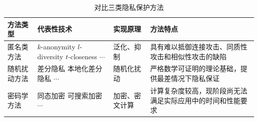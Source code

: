 \begin{table}[htbp]

\caption{对比三类隐私保护方法}
\label{tab:comparisionPrivacyMechanisms_1.2}
\centering
\fontsize{10pt}{\baselineskip}\selectfont

\begin{tabular}{p{}p{}p{}p{}}
\toprule
	\textbf{方法类型}&\textbf{代表性技术}&\textbf{实现原理}&\textbf{方法特点}\\
	\midrule
  匿名类方法 & \makecell[l]{$k$-anonymity \\ $l$-diversity \\$t$-closeness\\ $\cdots$} &泛化、抑制&具有难以抵御连接攻击、同质性攻击和相似性攻击的缺陷 \\
随机扰动方法 & \makecell[l]{差分隐私\\ 本地化差分隐私\\ $\cdots$} &随机化扰动& 严格数学可证明的理论基础，提供最差情况下隐私保证\\
密码学方法 & \makecell[l]{同态加密\\ 可搜索加密 \\ $\cdots$} &加密、密文计算&计算复杂度较高，现阶段尚无法满足实际应用中的时间和性能要求 \\

  \bottomrule
\end{tabular}
\end{table}

